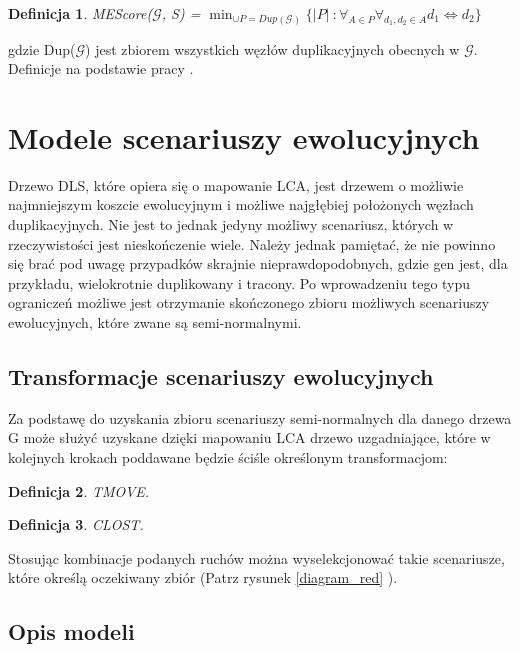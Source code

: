 \documentclass[licencjacka]{pracamgr}
\newtheorem{defi}{Definicja}[section]
\begin{document}
\begin{defi}\label{ME}
  MEScore($\mathcal{G}$, S) = $\min_{\cup P = Dup(\mathcal{G})} \lbrace \vert P \vert\ : \forall_{A \in P} \forall_{d_1,d_2 \in A} d_1 \Longleftrightarrow d_2 \rbrace$
\end{defi}
 gdzie Dup($\mathcal{G}$) jest zbiorem wszystkich węzłów duplikacyjnych obecnych w $\mathcal{G}$.
\newline
Definicje na podstawie pracy \cite{pasz}.

\section{Modele scenariuszy ewolucyjnych}

Drzewo DLS, które opiera się o mapowanie LCA, jest drzewem o możliwie najmniejszym koszcie ewolucyjnym i możliwe najgłębiej położonych węzłach duplikacyjnych. Nie jest to jednak jedyny możliwy scenariusz, których w rzeczywistości jest nieskończenie wiele. Należy jednak pamiętać, że nie powinno się brać pod uwagę przypadków skrajnie nieprawdopodobnych, gdzie gen jest, dla przykładu, wielokrotnie duplikowany i tracony. Po wprowadzeniu tego typu ograniczeń możliwe jest otrzymanie skończonego zbioru możliwych scenariuszy ewolucyjnych, które zwane są semi-normalnymi. 



\subsection{Transformacje scenariuszy ewolucyjnych}

Za podstawę do uzyskania zbioru scenariuszy semi-normalnych dla danego drzewa G może służyć uzyskane dzięki mapowaniu LCA drzewo uzgadniające, które w kolejnych krokach poddawane będzie ściśle określonym transformacjom: 

\begin{defi}\label{TMOVE}
  TMOVE.
\end{defi}

\begin{defi}\label{CLOST}
  CLOST.
\end{defi}

Stosując kombinacje podanych ruchów można wyselekcjonować takie scenariusze, które określą oczekiwany zbiór (Patrz rysunek \ref{diagram_red} ).

\subsection{Opis modeli}
\end{document}
